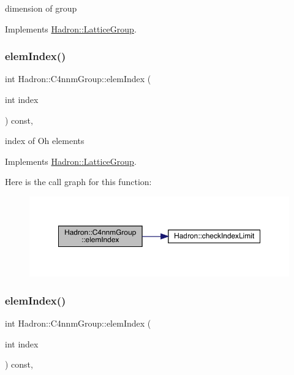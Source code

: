dimension of group 

Implements \mbox{\hyperlink{structHadron_1_1LatticeGroup_abd8415698323796ef6a8605796ee3bea}{Hadron\+::\+Lattice\+Group}}.

\mbox{\label{structHadron_1_1C4nnmGroup_a8cbcb161ddf801e759797f231db35f75}} 
\subsubsection{\texorpdfstring{elemIndex()}{elemIndex()}\hspace{0.1cm}{\footnotesize\ttfamily [1/2]}}
{\footnotesize\ttfamily int Hadron\+::\+C4nnm\+Group\+::elem\+Index (\begin{DoxyParamCaption}\item[{int}]{index }\end{DoxyParamCaption}) const\hspace{0.3cm}{\ttfamily [inline]}, {\ttfamily [virtual]}}

index of Oh elements 

Implements \mbox{\hyperlink{structHadron_1_1LatticeGroup_afb8e3ee60de059f75bce1044c694e1e8}{Hadron\+::\+Lattice\+Group}}.

Here is the call graph for this function\+:
\nopagebreak
\begin{figure}[H]
\begin{center}
\leavevmode
\includegraphics[width=350pt]{d1/dba/structHadron_1_1C4nnmGroup_a8cbcb161ddf801e759797f231db35f75_cgraph}
\end{center}
\end{figure}
\mbox{\label{structHadron_1_1C4nnmGroup_a8cbcb161ddf801e759797f231db35f75}} 
\subsubsection{\texorpdfstring{elemIndex()}{elemIndex()}\hspace{0.1cm}{\footnotesize\ttfamily [2/2]}}
{\footnotesize\ttfamily int Hadron\+::\+C4nnm\+Group\+::elem\+Index (\begin{DoxyParamCaption}\item[{int}]{index }\end{DoxyParamCaption}) const\hspace{0.3cm}{\ttfamily [inline]}, {\ttfamily [virtual]}}

